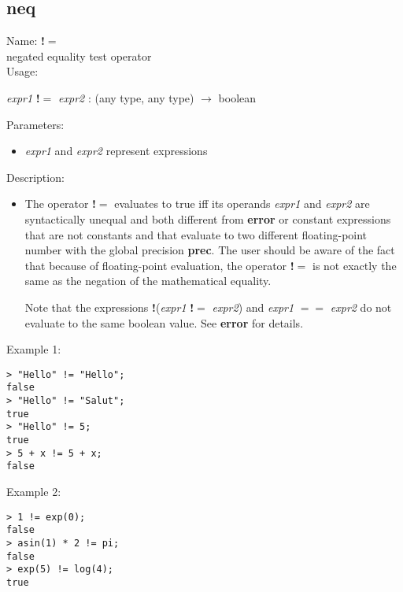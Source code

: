 \subsection{neq}
\label{labneq}
\noindent Name: \textbf{!$=$}\\
negated equality test operator\\
\noindent Usage: 
\begin{center}
\emph{expr1} \textbf{!$=$} \emph{expr2} : (\textsf{any type}, \textsf{any type}) $\rightarrow$ \textsf{boolean}
\end{center}
Parameters: 
\begin{itemize}
\item \emph{expr1} and \emph{expr2} represent expressions
\end{itemize}
\noindent Description: \begin{itemize}

\item The operator \textbf{!$=$} evaluates to true iff its operands \emph{expr1} and
   \emph{expr2} are syntactically unequal and both different from \textbf{error} or
   constant expressions that are not constants and that evaluate to two
   different floating-point number with the global precision \textbf{prec}. The
   user should be aware of the fact that because of floating-point
   evaluation, the operator \textbf{!$=$} is not exactly the same as the
   negation of the mathematical equality.
     
   Note that the expressions \textbf{!}(\emph{expr1} \textbf{!$=$} \emph{expr2}) and \emph{expr1}
   \textbf{$==$} \emph{expr2} do not evaluate to the same boolean value. See \textbf{error}
   for details.
\end{itemize}
\noindent Example 1: 
\begin{center}\begin{minipage}{15cm}\begin{Verbatim}[frame=single]
> "Hello" != "Hello";
false
> "Hello" != "Salut";
true
> "Hello" != 5;
true
> 5 + x != 5 + x;
false
\end{Verbatim}
\end{minipage}\end{center}
\noindent Example 2: 
\begin{center}\begin{minipage}{15cm}\begin{Verbatim}[frame=single]
> 1 != exp(0);
false
> asin(1) * 2 != pi;
false
> exp(5) != log(4);
true
\end{Verbatim}
\end{minipage}\end{center}
